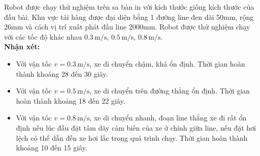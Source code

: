           \hspace*{0.6cm}Robot được chạy thử nghiệm trên sa bàn in với kích thước giống kích thước của đầu bài. Khu vực tải hàng được đại diện bằng 1 đường line đen dài 50mm, rộng 26mm và cách vị trí xuất phát đầu line 2000mm. Robot được thử nghiệm chạy với các tốc độ khác nhau $0.3 \,\mathrm{m/s}, \,  0.5 \,\mathrm{m/s}, \, 0.8 \,\mathrm{m/s}$.\\[0.2cm]
               \hspace*{0.6cm}\textbf{Nhận xét:}
               \begin{itemize}
                    \item Với vận tốc $v = 0.3 \,\mathrm{m/s}$, xe di chuyển chậm, khá ổn định. Thời gian hoàn thành khoảng 28 đến 30 giây.
                    \item Với vận tốc $v = 0.5 \,\mathrm{m/s}$, xe di chuyển trên đường thẳng ổn định. Thời gian hoàn thành khoảng 18 đến 22 giây.
                    \item Với vận tốc $v = 0.8 \,\mathrm{m/s}$, xe di chuyển nhanh, đoạn line thẳng xe đi rất ổn định nếu lúc đầu đặt tâm dãy cảm biến của xe ở chính giữa line, nếu đặt hơi lệch có thể dẫn đến xe hơi lắc trong quá trình chạy. Thời gian hoàn thành khoảng 10 đến 15 giây.
               \end{itemize}
